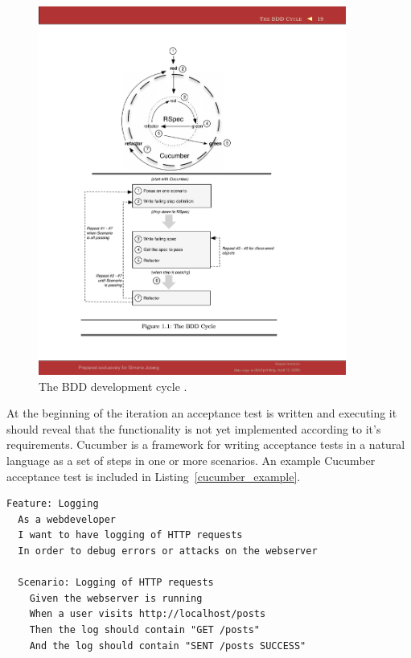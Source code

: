 \begin{figure}[htb]
  \centering
  \includegraphics[width=0.9\textwidth]{diagrams/bdd_cycle.pdf}
  \caption{The BDD development cycle \cite{rspecbook}.}
  \label{bdd_cycle}
\end{figure}

At the beginning of the iteration an acceptance test is written and executing
it should reveal that the functionality is not yet implemented according to
it's requirements. Cucumber is a framework for writing acceptance tests in a
natural language as a set of steps in one or more scenarios.  An example
Cucumber acceptance test is included in Listing~\ref{cucumber_example}.

\bigskip
\begin{lstlisting}[label=cucumber_example,caption=Cucumber acceptance test example]
Feature: Logging
  As a webdeveloper
  I want to have logging of HTTP requests
  In order to debug errors or attacks on the webserver

  Scenario: Logging of HTTP requests
    Given the webserver is running
    When a user visits http://localhost/posts
    Then the log should contain "GET /posts"
    And the log should contain "SENT /posts SUCCESS"
\end{lstlisting}

